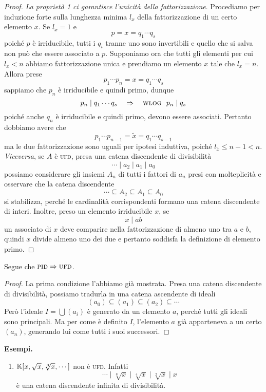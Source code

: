 \begin{multicols}{2}
\begin{proof}
	\emph{La proprietà 1 ci garantisce l'unicità della fattorizzazione}. Procediamo per induzione forte sulla lunghezza minima $ l_x $ della fattorizzazione di un certo elemento $ x $. Se $ l_x = 1 $ e
	\[ p = x = q_1 \cdots q_s \]
	poiché $ p $ è irriducibile, tutti i $ q_i $ tranne uno sono invertibili e quello che si salva non può che essere associato a $ p $. Supponiamo ora che tutti gli elementi per cui $ l_x < n $ abbiamo fattorizzazione unica e prendiamo un elemento $ x $ tale che $ l_x = n $. Allora prese
	\[ p_1 \cdots p_n = x = q_1 \cdots q_s \]
	sappiamo che $ p_n $ è irriducibile e quindi primo, dunque
	\[ p_n \mid q_1 \cdots q_s \quad\Rightarrow\quad \textsc{wlog }\; p_n \mid q_s  \]
	poiché anche $ q_n $ è irriducibile e quindi primo, devono essere associati. Pertanto dobbiamo avere che
	\[ p_1 \cdots p_{n-1} = \tilde{x} = q_1 \cdots q_{s-1} \]
	ma le due fattorizzazione sono uguali per ipotesi induttiva, poiché $ l_{\tilde{x}} \leq n-1 < n $.\\
	
	\emph{Viceversa}, se $ A $ è \textsc{ufd}, presa una catena discendente di divisibilità
	\[ \cdots \mid a_2 \mid a_1 \mid a_0 \]
	possiamo considerare gli insiemi $ A_n $ di tutti i fattori di $ a_n $ presi con molteplicità e osservare che la catena discendente
	\[ \cdots \subseteq A_2 \subseteq A_1 \subseteq A_0 \]
	si stabilizza, perché le cardinalità corrispondenti formano una catena discendente di interi.
	Inoltre, preso un elemento irriducibile $ x $, se
	\[ x \mid ab \]
	un associato di $ x $ deve comparire nella fattorizzazione di almeno uno tra $ a $ e $ b $, quindi $ x $ divide almeno uno dei due e pertanto soddisfa la definizione di elemento primo.
\end{proof}

\begin{prop}\label{def}
	Segue che $ \textsc{pid}\Rightarrow \textsc{ufd} $.
\end{prop}
\begin{proof}
	La prima condizione l'abbiamo già mostrata. Presa una catena discendente di divisibilità, possiamo tradurla in una catena ascendente di ideali
	\[ (a_0) \subseteq (a_1 ) \subseteq (a_2) \subseteq \cdots \]
	Però l'ideale $ I = \bigcup (a_i) $ è generato da un elemento $ a $, perché tutti gli ideali sono principali. Ma per come è definito $ I $, l'elemento $ a $ già apparteneva a un certo $ (a_n) $, generando lui come tutti i suoi successori. 
\end{proof}

\textbf{Esempi.}
\begin{enumerate}
	\item $ \mathbb{K} [x, \sqrt{x}, \sqrt[3]{x}, \cdots ] $ non è \textsc{ufd}. Infatti 
	\[ \cdots \mid \sqrt[8]{x} \mid \sqrt[4]{x} \mid \sqrt[2]{x} \mid x \]
	è una catena discendente infinita di divisibilità.
	

\end{enumerate}
\end{multicols}
